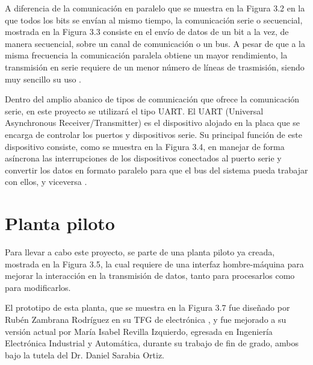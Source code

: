 A diferencia de la comunicación en paralelo que se muestra en la Figura 3.2 en la que todos los bits se envían al mismo tiempo, la comunicación serie o secuencial, mostrada en la Figura 3.3 consiste en el envío de datos de un bit a la vez, de manera secuencial, sobre un canal de comunicación o un bus. A pesar de que a la misma frecuencia la comunicación paralela obtiene un mayor rendimiento, la transmisión en serie requiere de un menor número de líneas de trasmisión, siendo muy sencillo su uso \cite{web:04ibmCom}.



Dentro del amplio abanico de tipos de comunicación que ofrece la comunicación serie, en este proyecto se utilizará el tipo UART. El UART (Universal Asynchronous Receiver/Transmitter) es el dispositivo alojado en la placa que se encarga de controlar los puertos y dispositivos serie. Su principal función de este dispositivo consiste, como se muestra en la Figura 3.4, en manejar de forma asíncrona las interrupciones de los dispositivos conectados al puerto serie y convertir los datos en formato paralelo para que el bus del sistema pueda trabajar con ellos, y viceversa \cite{web:05uart}.


\section{Planta piloto}

Para llevar a cabo este proyecto, se parte de una planta piloto ya creada, mostrada en la Figura 3.5, la cual requiere de una interfaz hombre-máquina para mejorar la interacción en la transmisión de datos, tanto para procesarlos como para modificarlos.



El prototipo de esta planta, que se muestra en la Figura 3.7 fue diseñado por Rubén Zambrana Rodríguez en su TFG de electrónica \cite{06tfgRuben}, y fue mejorado a su versión actual por María Isabel Revilla Izquierdo, egresada en Ingeniería Electrónica Industrial y Automática, durante su trabajo de fin de grado\cite{07tfgMaria}, ambos bajo la tutela del Dr. Daniel Sarabia Ortiz.

